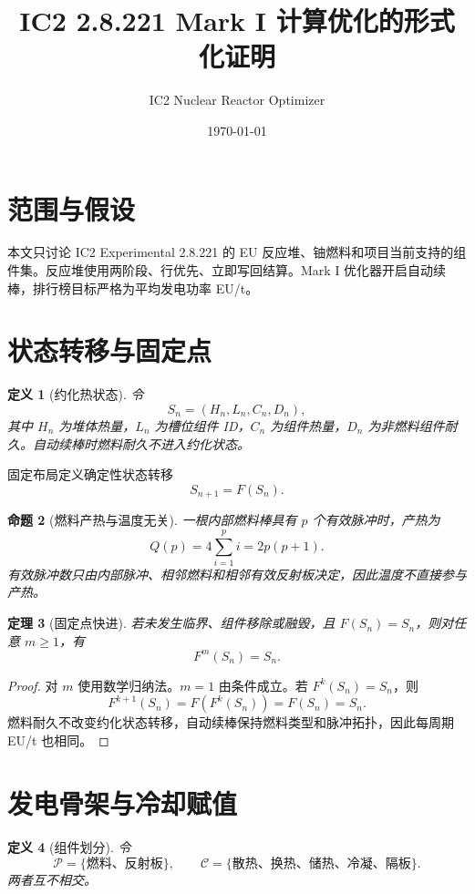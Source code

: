 \documentclass[UTF8,11pt]{ctexart}
\title{IC2 2.8.221 Mark I 计算优化的形式化证明}
\author{IC2 Nuclear Reactor Optimizer}
\date{\today}
\newtheorem{definition}{定义}[section]
\newtheorem{theorem}[definition]{定理}
\newtheorem{proposition}[definition]{命题}
\begin{document}
\maketitle
\tableofcontents

\section{范围与假设}

本文只讨论 IC2 Experimental 2.8.221 的 EU 反应堆、铀燃料和项目当前支持的组件集。反应堆使用两阶段、行优先、立即写回结算。Mark I 优化器开启自动续棒，排行榜目标严格为平均发电功率 EU/t。

\section{状态转移与固定点}

\begin{definition}[约化热状态]
令
\[
S_n=(H_n,L_n,C_n,D_n),
\]
其中 $H_n$ 为堆体热量，$L_n$ 为槽位组件 ID，$C_n$ 为组件热量，$D_n$ 为非燃料组件耐久。自动续棒时燃料耐久不进入约化状态。
\end{definition}

固定布局定义确定性状态转移
\[
S_{n+1}=F(S_n).
\]

\begin{proposition}[燃料产热与温度无关]
一根内部燃料棒具有 $p$ 个有效脉冲时，产热为
\[
Q(p)=4\sum_{i=1}^{p}i=2p(p+1).
\]
有效脉冲数只由内部脉冲、相邻燃料和相邻有效反射板决定，因此温度不直接参与产热。
\end{proposition}

\begin{theorem}[固定点快进]
若未发生临界、组件移除或融毁，且 $F(S_n)=S_n$，则对任意 $m\ge1$，有
\[
F^m(S_n)=S_n.
\]
\end{theorem}

\begin{proof}
对 $m$ 使用数学归纳法。$m=1$ 由条件成立。若 $F^k(S_n)=S_n$，则
\[
F^{k+1}(S_n)=F(F^k(S_n))=F(S_n)=S_n.
\]
燃料耐久不改变约化状态转移，自动续棒保持燃料类型和脉冲拓扑，因此每周期 EU/t 也相同。
\end{proof}

\section{发电骨架与冷却赋值}

\begin{definition}[组件划分]
令
\[
\mathcal P=\{\text{燃料、反射板}\},\qquad
\mathcal C=\{\text{散热、换热、储热、冷凝、隔板}\}.
\]
两者互不相交。
\end{definition}
\end{document}
